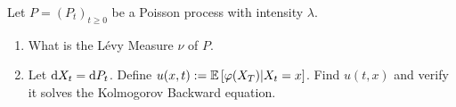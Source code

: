 \documentclass[10pt]{article}
\begin{document}
\maketitle

\begin{problem}[Exercise 10.1]
    Let \( P=(P_t)_{t\geq 0} \) be a Poisson process with intensity \( \lambda \).
    \begin{enumerate}[label=(\alph*)]
        \item What is the L\'evy Measure \( \nu \) of \( P \).
        \item Let \( \mathrm{d} X_t = \mathrm{d} P_t \). Define \( u(x,t):=\mathbb{E} \left[ \varphi(X_T) | X_t = x \right] \). Find \( u(t,x) \) and verify it solves the Kolmogorov Backward equation.
    \end{enumerate}
\end{problem}
\end{document}
